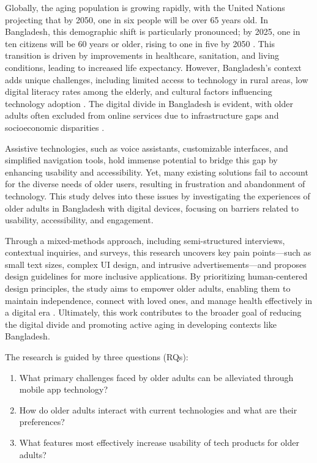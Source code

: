 \documentclass[acmlarge]{acmart}
\begin{document}
Globally, the aging population is growing rapidly, with the United Nations projecting that by 2050, one in six people will be over 65 years old. In Bangladesh, this demographic shift is particularly pronounced; by 2025, one in ten citizens will be 60 years or older, rising to one in five by 2050 \cite{kabir2025agingbangladesh}. This transition is driven by improvements in healthcare, sanitation, and living conditions, leading to increased life expectancy. However, Bangladesh's context adds unique challenges, including limited access to technology in rural areas, low digital literacy rates among the elderly, and cultural factors influencing technology adoption \cite{islam2019elderlybangladesh, rahman2022localcontext}. The digital divide in Bangladesh is evident, with older adults often excluded from online services due to infrastructure gaps and socioeconomic disparities \cite{rahman2021digitalinequality}.

Assistive technologies, such as voice assistants, customizable interfaces, and simplified navigation tools, hold immense potential to bridge this gap by enhancing usability and accessibility. Yet, many existing solutions fail to account for the diverse needs of older users, resulting in frustration and abandonment of technology. This study delves into these issues by investigating the experiences of older adults in Bangladesh with digital devices, focusing on barriers related to usability, accessibility, and engagement.

Through a mixed-methods approach, including semi-structured interviews, contextual inquiries, and surveys, this research uncovers key pain points—such as small text sizes, complex UI design, and intrusive advertisements—and proposes design guidelines for more inclusive applications. By prioritizing human-centered design principles, the study aims to empower older adults, enabling them to maintain independence, connect with loved ones, and manage health effectively in a digital era \cite{czaja2019aging, fisk2009designing}. Ultimately, this work contributes to the broader goal of reducing the digital divide and promoting active aging in developing contexts like Bangladesh.

The research is guided by three questions (RQs):
\begin{enumerate}
    \item What primary challenges faced by older adults can be alleviated through mobile app technology?
    \item How do older adults interact with current technologies and what are their preferences?
    \item What features most effectively increase usability of tech products for older adults?
\end{enumerate}
\end{document}
